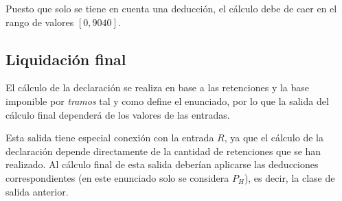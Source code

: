 Puesto que solo se tiene en cuenta una deducción, el cálculo debe de caer en el rango
de valores $[0, 9040]$\texteuro.

\subsection{Liquidación final}
El cálculo de la declaración se realiza en base a las retenciones y la base imponible por \textit{tramos}
tal y como define el enunciado, por lo que la salida del cálculo final dependerá de los valores
de las entradas.

Esta salida tiene especial conexión con la entrada $R$, ya que el cálculo de la declaración
depende directamente de la cantidad de retenciones que se han realizado. Al cálculo final de esta salida
deberían aplicarse las deducciones correspondientes (en este enunciado solo se considera $P_{H}$), es
decir, la clase de salida anterior.
